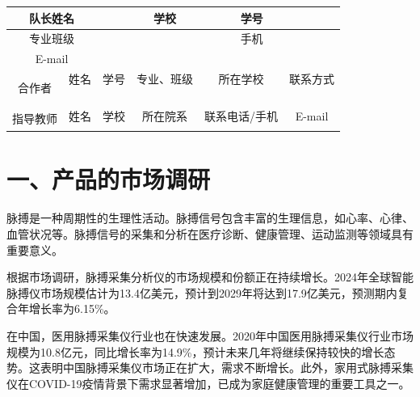 \documentclass[a4paper,12pt]{article}
\begin{document}
\begin{table}[H]
    \centering
    \renewcommand{\arraystretch}{1.5}
    \begin{tabular}{|c|c|c|c|c|c|c|}
        \hline
        \multicolumn{2}{|c|}{队长姓名} & & 学校 & & 学号 & \\
        \hline
        \multicolumn{2}{|c|}{专业班级} & \multicolumn{3}{c|}{} & 手机 & \\
        \hline
        \multicolumn{2}{|c|}{E-mail} & \multicolumn{5}{c|}{} \\
        \hline
        \multirow{5}{*}{合作者} & 姓名 & 学号 & 专业、班级 & \multicolumn{2}{c|}{所在学校} & 联系方式 \\
        \cline{2-7}
        & & & & \multicolumn{2}{c|}{} & \\
        \cline{2-7}
        & & & & \multicolumn{2}{c|}{} & \\
        \cline{2-7}
        & & & & \multicolumn{2}{c|}{} & \\
        \cline{2-7}
        & & & & \multicolumn{2}{c|}{} & \\
        \hline
        \multirow{2}{*}{指导教师} & 姓名 & 学校 & 所在院系 & \multicolumn{2}{c|}{联系电话/手机} & E-mail \\
        \cline{2-7}
        & & & & \multicolumn{2}{c|}{} & \\
        \hline
    \end{tabular}
\end{table}

\vspace{1cm}

\section*{一、产品的市场调研}
脉搏是一种周期性的生理性活动。脉搏信号包含丰富的生理信息，如心率、心律、血管状况等。脉搏信号的采集和分析在医疗诊断、健康管理、运动监测等领域具有重要意义。

根据市场调研，脉搏采集分析仪的市场规模和份额正在持续增长。2024年全球智能脉搏仪市场规模估计为13.4亿美元，预计到2029年将达到17.9亿美元，预测期内复合年增长率为6.15\%。

在中国，医用脉搏采集仪行业也在快速发展。2020年中国医用脉搏采集仪行业市场规模为10.8亿元，同比增长率为14.9\%，预计未来几年将继续保持较快的增长态势。这表明中国脉搏采集仪市场正在扩大，需求不断增长。此外，家用式脉搏采集仪在COVID-19疫情背景下需求显著增加，已成为家庭健康管理的重要工具之一。
\end{document}
